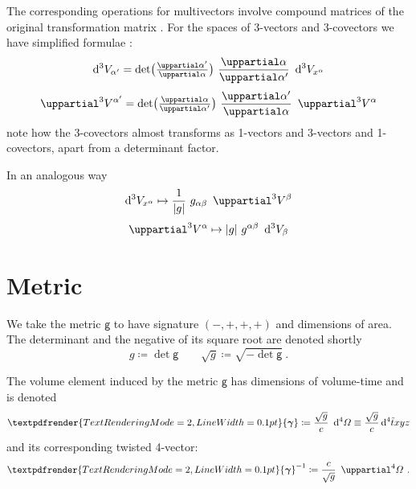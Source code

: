 \documentclass[a4paper,12pt,%
onecolumn,oneside,article,%
british%
]{memoir}
\theoremstyle{remark}
\theoremstyle{innote}
\newcommand*{\mathte}[1]{\bm{\mathsf{#1}}}
\newcommand*{\xbm}[1]{\textpdfrender{TextRenderingMode=2,LineWidth=0.1pt}{\boldsymbol{#1}}}
\newcommand*{\de}{\mathop{}\!\uppartial}%
\newcommand*{\di}{\mathop{}\!\mathrm{d}}%
\newcommand*{\defd}{\coloneqq}
\DeclarePairedDelimiter\abs{\lvert}{\rvert}
\renewcommand*{\|}[1][]{\nonscript\:#1\vert\nonscript\:\mathopen{}}
\newcommand*{\sect}{\S}%
\newcommand*{\eqn}{eq.}%
\newcommand*{\ssssi}[1]{\di^{4}{#1}}
\newcommand*{\tw}[1]{\tilde{#1}}
\newcommand*{\ttte}[1]{\de^{3}V^{#1}}
\newcommand*{\tttte}[1]{\de^{4}\varOmega^{#1}}
\newcommand*{\ttti}[1]{\di^{3}V_{#1}}
\newcommand*{\tttti}[1]{\di^{4}\varOmega_{#1}}
\newcommand*{\yg}{\mathte{g}}
\newcommand*{\dg}{\sqrt{g}}
\newcommand*{\ve}{\xbm{\gamma}}%
\newcommand*{\vi}{\xbm{\gamma}^{-1}}%
\begin{document}
The corresponding operations for multivectors involve {compound matrices} of the original transformation matrix \autocites[\sect~IV.A.1 p.~199]{choquetbruhatetal1977_r1996}. For the spaces of 3-vectors and 3-covectors we have simplified formulae \autocites[\sect~I.4 \eqn~(33)]{gantmacher1959_r2000}:
\begin{equation}
  \label{eq:transf3_simple}
  \begin{gathered}
    \ttti{\alpha'} =
    \det\bigl(
    \tfrac{\de \alpha'}{\de \alpha}
    \bigr)
    \ 
    \frac{\de \alpha}{\de \alpha'}
    \ 
    \ttti{x^{\alpha}}
    \\[\jot]
    \ttte{\alpha'} =
    \det\bigl(
    \tfrac{\de \alpha}{\de \alpha'}
    \bigr)
    \ 
    \frac{\de \alpha'}{\de \alpha}
    \ 
    \ttte{\alpha}
  \end{gathered}
\end{equation}
note how the 3-covectors almost transforms as 1-vectors and 3-vectors and 1-covectors, apart from a determinant factor.

In an analogous way
\begin{equation}
  \label{eq:raise3_simple}
  \begin{gathered}
    \ttti{x^{\alpha}}
    \mapsto
\frac{1}{\abs{g}}\ g_{\alpha\beta}\
    \ttte{\beta}
    \\[\jot]
    \ttte{\alpha}
    \mapsto
\abs{g}\ g^{\alpha\beta}\
    \ttti{\beta}
  \end{gathered}
\end{equation}


\section{Metric}
\label{sec:metric}

We take the metric $\yg$ to have signature $(-,+,+,+)$ and dimensions of area. The determinant and the negative of its square root are denoted shortly
\begin{equation}
  \label{eq:det_g}
  g\defd \det\yg
  \qquad
\dg \defd \sqrt{-\det\yg} \ .
\end{equation}

The volume element induced by the metric $\yg$ has dimensions of volume-time and is denoted%
\begin{equation}
  \label{eq:vol_element}
  \ve \defd \frac{\dg}{c}\ \tttti{} \equiv \frac{\dg}{c} \ssssi{\tw{t}xyz}
\end{equation}
and its corresponding twisted 4-vector:
\begin{equation}
  \label{eq:inv_vol_element}
  \vi \defd \frac{c}{\dg}\ \tttte{} \ .
\end{equation}
\end{document}
